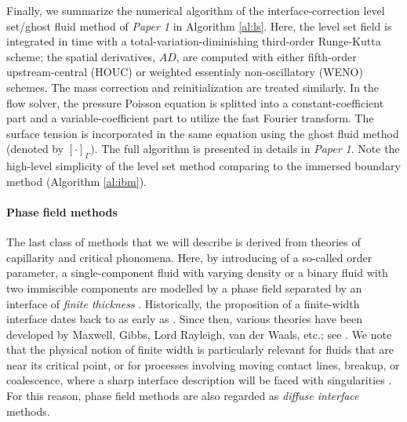 Finally, we summarize the numerical algorithm of the interface-correction level set/ghost fluid method of \emph{Paper 1} in Algorithm \ref{al:ls}.
Here, the level set field is integrated in time with a total-variation-diminishing third-order Runge-Kutta scheme; the spatial derivatives, ${AD}$, are computed with either fifth-order upstream-central (HOUC) or weighted essentialy non-oscillatory (WENO) schemes. The mass correction and reinitialization are treated similarly.
In the flow solver, the pressure Poisson equation is splitted into a constant-coefficient part and a variable-coefficient part to utilize the fast Fourier transform.
The surface tension is incorporated in the same equation using the ghost fluid method (denoted by $[\cdot]_\Gamma$).
The full algorithm is presented in details in \emph{Paper 1}. Note the high-level simplicity of the level set method comparing to the immersed boundary method (Algorithm \ref{al:ibm}).


\medskip
\paragraph{\bf Phase field methods}

The last class of methods that we will describe is derived from theories of capillarity and critical phonomena.
Here, by introducing of a so-called order parameter, a single-component fluid with varying density or a binary fluid with two immiscible components are modelled by a phase field separated by an interface of \emph{finite thickness} \citep{Anderson_McFadden_Wheeler}.
Historically, the proposition of a finite-width interface dates back to as early as \cite{Poisson1831}. Since then, various theories have been developed by Maxwell, Gibbs, Lord Rayleigh, van der Waals, etc.; see \eg \cite{van-der-waals1893, Cahn1961}.
We note that the physical notion of finite width is particularly relevant for fluids that are near its critical point, or for processes involving moving contact lines, breakup, or coalescence, where a sharp interface description will be faced with singularities \citep{Zhang_Mohseni_2018, Eggers1997}.
For this reason, phase field methods are also regarded as \emph{diffuse interface} methods.

